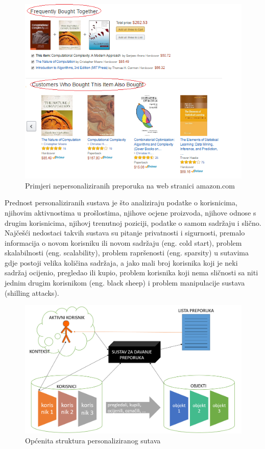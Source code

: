 \documentclass[a4paper,oneside,12pt]{memoir} %
\begin{document}
%
\begin{figure}
\begin{center}
\includegraphics[scale=1]{slike/amazon-non_personalized_recom.png}
\caption{Primjeri nepersonaliziranih preporuka na web stranici amazon.com}
\end{center}
\end{figure}
%
\bigskip
\par Prednost personaliziranih sustava je što analiziraju podatke o korisnicima, njihovim aktivnostima u prošlostima, njihove ocjene proizvoda, njihove odnose s drugim korisnicima, njihovj trenutnoj poziciji, podatke o samom sadržaju i slično. Najčešći nedostaci takvih sustava su pitanje privatnosti i sigurnosti, premalo informacija o novom korisniku ili novom sadržaju (eng. cold start), problem skalabilnosti (eng. scalability), problem rapršenosti (eng. sparsity) u sutavima gdje postoji velika količina sadržaja, a jako mali broj korisnika koji je neki sadržaj ocijenio, pregledao ili kupio, problem korisnika koji nema sličnosti sa niti jednim drugim korisnikom (eng. black sheep) i problem manipulacije sustava (shilling attacks).
\bigskip
%
\begin{figure}
\begin{center}
\includegraphics[scale=0.4]{slike/recommendation_systems.png}
\caption{Općenita struktura personaliziranog sutava}
\end{center}
\end{figure}
\end{document}
